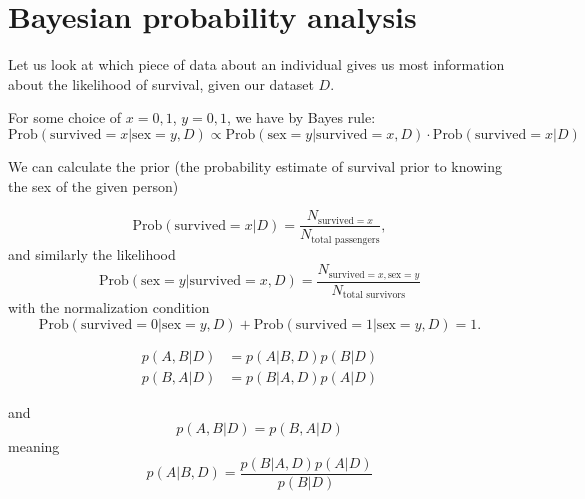 \documentclass{book}
\begin{document}
\clearpage

\section*{Bayesian probability analysis}
Let us look at which piece of data about an individual gives us most information 
about the likelihood of survival, given our dataset $D$.

For some choice of $x=0,1$, $y=0,1$, we have by Bayes rule:
\begin{equation}
    \text{Prob}(\text{survived}=x | \text{sex}=y, D) \propto \text{Prob}( \text{sex}=y|\text{survived}=x,D ) \cdot \text{Prob}(\text{survived}=x|D)
\end{equation}

We can calculate the prior (the probability estimate of survival prior to knowing the sex of the given person)

\begin{equation}
    \text{Prob}(\text{survived}=x|D) = \frac{N_{\text{survived}=x}}{N_\text{total passengers}},
\end{equation}
and similarly the likelihood
\begin{equation}
    \text{Prob}(\text{sex}=y|\text{survived}=x, D) = \frac{N_{\text{survived}=x, \text{sex}=y}}{N_\text{total survivors}}
\end{equation}
with the normalization condition 
\begin{equation}
    \text{Prob}(\text{survived}=0|\text{sex}=y, D) + \text{Prob}(\text{survived}=1|\text{sex}=y, D) = 1.
\end{equation}






\clearpage
\begin{equation}
    \begin{split}
        p(A,B|D) & = p(A|B,D)p(B|D) \\
        p(B,A|D) & = p(B|A,D)p(A|D)
    \end{split}
\end{equation}

and
\begin{equation}
    p(A,B|D) = p(B,A|D)
\end{equation}
meaning 
\begin{equation}
    p(A|B,D) =  \frac{p(B|A,D)p(A|D)}{p(B|D)}
\end{equation}
\end{document}

